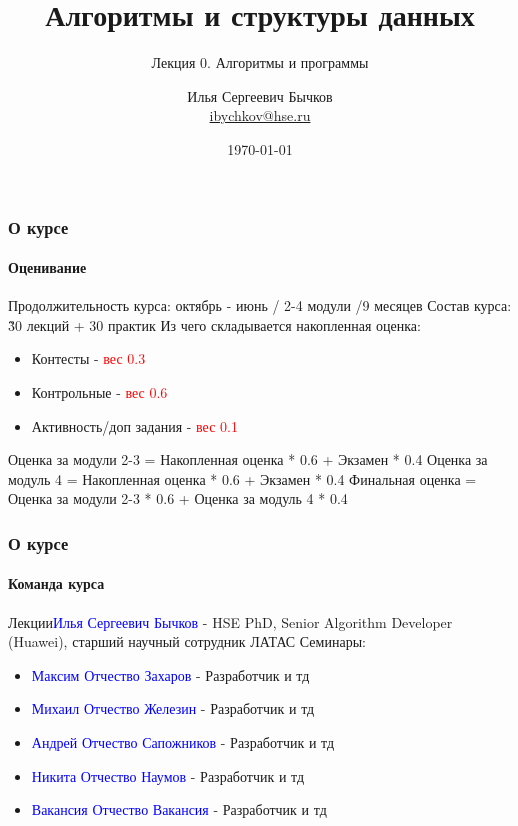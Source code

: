 \documentclass[aspectratio=169]{beamer}
\title[Title]{Алгоритмы и структуры данных}
\subtitle{Лекция 0. Алгоритмы и программы}
\author[Author's name]{Илья Сергеевич Бычков\\ \smallskip \scriptsize \url{ibychkov@hse.ru}}
\institute{НИУ ВШЭ - Нижний Новгород}
\date{\today}
\begin{document}
\frame[plain]{\titlepage}

\begin{frame}
\frametitle{О курсе}
\framesubtitle{Оценивание}
Продолжительность курса: октябрь - июнь / 2-4 модули /9 месяцев\newline
Состав курса: \~ 30 лекций + 30 практик\newline\newline
Из чего складывается накопленная оценка:
\begin{itemize}
  \item{Контесты - \textcolor{red}{вес 0.3}}
  \item{Контрольные - \textcolor{red}{вес 0.6}}
  \item{Активность/доп задания - \textcolor{red}{вес 0.1}}
\end{itemize}
Оценка за модули 2-3 = Накопленная оценка * 0.6 + Экзамен * 0.4\newline
Оценка за модуль 4 = Накопленная оценка * 0.6 + Экзамен * 0.4\newline\newline
Финальная оценка = Оценка за модули 2-3 * 0.6 + Оценка за модуль 4 * 0.4
\end{frame}

\begin{frame}
\frametitle{О курсе}
\framesubtitle{Команда курса}
Лекции\newline \textcolor{blue}{Илья Сергеевич Бычков} - HSE PhD, Senior Algorithm Developer (Huawei), старший научный сотрудник ЛАТАС\newline\newline
Семинары:
\begin{itemize}
  \item{\textcolor{blue}{Максим Отчество Захаров} - Разработчик и тд}
  \item{\textcolor{blue}{Михаил Отчество Железин} - Разработчик и тд}
  \item{\textcolor{blue}{Андрей Отчество Сапожников} - Разработчик и тд}
  \item{\textcolor{blue}{Никита Отчество Наумов} - Разработчик и тд}
  \item{\textcolor{blue}{Вакансия Отчество Вакансия} - Разработчик и тд}
\end{itemize}
\end{frame}
\end{document}
